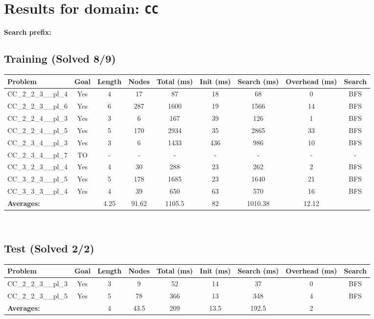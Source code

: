 \documentclass{article}
\begin{document}
\section*{Results for domain: \texttt{CC}}
\textbf{Search prefix:} 
\\[0.5cm]
\subsection*{Training (Solved 8/9)}
\begin{tabular}{lcccccccc}
\toprule
Problem & Goal & Length & Nodes & Total (ms) & Init (ms) & Search (ms) & Overhead (ms) & Search \\
\midrule
CC\_2\_2\_3\_\_pl\_4 & Yes & 4 & 17 & 87 & 18 & 68 & 0 & BFS \\
CC\_2\_2\_3\_\_pl\_6 & Yes & 6 & 287 & 1600 & 19 & 1566 & 14 & BFS \\
CC\_2\_2\_4\_\_pl\_3 & Yes & 3 & 6 & 167 & 39 & 126 & 1 & BFS \\
CC\_2\_2\_4\_\_pl\_5 & Yes & 5 & 170 & 2934 & 35 & 2865 & 33 & BFS \\
CC\_2\_3\_4\_\_pl\_3 & Yes & 3 & 6 & 1433 & 436 & 986 & 10 & BFS \\
CC\_2\_3\_4\_\_pl\_7 & TO & - & - & - & - & - & - & - \\
CC\_3\_2\_3\_\_pl\_4 & Yes & 4 & 30 & 288 & 23 & 262 & 2 & BFS \\
CC\_3\_2\_3\_\_pl\_5 & Yes & 5 & 178 & 1685 & 23 & 1640 & 21 & BFS \\
CC\_3\_3\_3\_\_pl\_4 & Yes & 4 & 39 & 650 & 63 & 570 & 16 & BFS \\
\textbf{Averages:} & & 4.25 & 91.62 & 1105.5 & 82 & 1010.38 & 12.12 & \\
\bottomrule
\end{tabular}
\\[0.7cm]
\subsection*{Test (Solved 2/2)}
\begin{tabular}{lcccccccc}
\toprule
Problem & Goal & Length & Nodes & Total (ms) & Init (ms) & Search (ms) & Overhead (ms) & Search \\
\midrule
CC\_2\_2\_3\_\_pl\_3 & Yes & 3 & 9 & 52 & 14 & 37 & 0 & BFS \\
CC\_2\_2\_3\_\_pl\_5 & Yes & 5 & 78 & 366 & 13 & 348 & 4 & BFS \\
\textbf{Averages:} & & 4 & 43.5 & 209 & 13.5 & 192.5 & 2 & \\
\bottomrule
\end{tabular}
\\[0.7cm]
\end{document}
